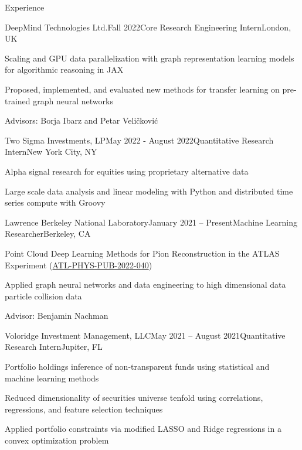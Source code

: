 \documentclass{resume} %
\begin{document}
\begin{rSection}{Experience}

\begin{rSubsection}{DeepMind Technologies Ltd.}{Fall 2022}{Core Research Engineering Intern}{London, UK}
    \item Scaling and GPU data parallelization with graph representation learning models for algorithmic reasoning in JAX
    \item Proposed, implemented, and evaluated new methods for transfer learning on pre-trained graph neural networks
    \item Advisors: Borja Ibarz and Petar Veličković
\end{rSubsection}

\begin{rSubsection}{Two Sigma Investments, LP}{May 2022 - August 2022}{Quantitative Research Intern}{New York City, NY}
     \item Alpha signal research for equities using proprietary alternative data
     \item Large scale data analysis and linear modeling with Python and distributed time series compute with Groovy
\end{rSubsection}

\begin{rSubsection}{Lawrence Berkeley National Laboratory}{January 2021 – Present}{Machine Learning Researcher}{Berkeley, CA}
    \item Point Cloud Deep Learning Methods for Pion Reconstruction in the ATLAS Experiment (\href{https://cds.cern.ch/record/2825379/files/ATL-PHYS-PUB-2022-040.pdf}{ATL-PHYS-PUB-2022-040})    
    \item Applied graph neural networks and data engineering to high dimensional data particle collision data
    \item Advisor: Benjamin Nachman
\end{rSubsection}

\begin{rSubsection}{Voloridge Investment Management, LLC}{May 2021 – August 2021}{Quantitative Research Intern}{Jupiter, FL}
    \item Portfolio holdings inference of non-transparent funds using statistical and machine learning methods
    \item Reduced dimensionality of securities universe tenfold using correlations, regressions, and feature selection techniques
    \item Applied portfolio constraints via modified LASSO and Ridge regressions in a convex optimization problem
\end{rSubsection}


\end{rSection}
\end{document}
